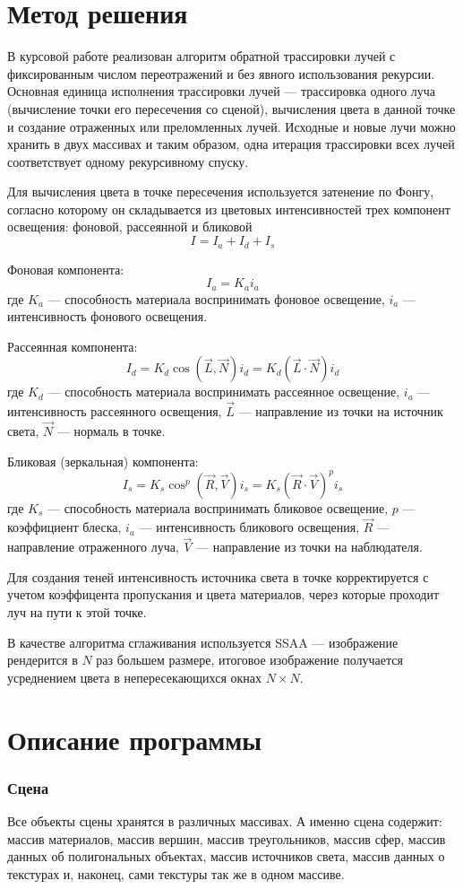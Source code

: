 \section{Метод решения}
В курсовой работе реализован алгоритм обратной трассировки лучей с фиксированным числом переотражений и без явного использования рекурсии. Основная единица исполнения трассировки лучей --- трассировка одного луча (вычисление точки его пересечения со сценой), вычисления цвета в данной точке и создание отраженных или преломленных лучей. Исходные и новые лучи можно хранить в двух массивах и таким образом, одна итерация трассировки всех лучей соответствует одному рекурсивному спуску.

Для вычисления цвета в точке пересечения используется затенение по Фонгу, согласно которому он складывается из цветовых интенсивностей трех компонент освещения: фоновой, рассеянной и бликовой
$$I = I_a + I_d + I_s$$

Фоновая компонента:
$$I_a = K_a i_a$$
где $K_a$ --- способность материала воспринимать фоновое освещение, $i_a$ --- интенсивность фонового освещения.

Рассеянная компонента:
$$I_d = K_d \cos(\vec{L}, \vec{N}) i_d = K_d (\vec{L} \cdot \vec{N}) i_d$$
где $K_d$ --- способность материала воспринимать рассеянное освещение, $i_a$ --- интенсивность рассеянного освещения, $\vec{L}$ --- направление из точки на источник света, $\vec{N}$ --- нормаль в точке.

Бликовая (зеркальная) компонента:
$$I_s = K_s \cos^p(\vec{R}, \vec{V}) i_s = K_s (\vec{R} \cdot \vec{V})^p i_s$$
где $K_s$ --- способность материала воспринимать бликовое освещение, $p$ --- коэффициент блеска, $i_a$ --- интенсивность бликового освещения, $\vec{R}$ --- направление отраженного луча, $\vec{V}$ --- направление из точки на наблюдателя.

Для создания теней интенсивность источника света в точке корректируется с учетом коэффицента пропускания и цвета материалов, через которые проходит луч на пути к этой точке.

В качестве алгоритма сглаживания используется SSAA --- изображение рендерится в $N$ раз большем размере, итоговое изображение получается усреднением цвета в непересекающихся окнах $N \times N$.

\section{Описание программы}
\subsubsection*{Сцена}
Все объекты сцены хранятся в различных массивах. А именно сцена содержит: массив материалов, массив вершин, массив треугольников, массив сфер, массив данных об полигональных объектах, массив источников света, массив данных о текстурах и, наконец, сами текстуры так же в одном массиве.

